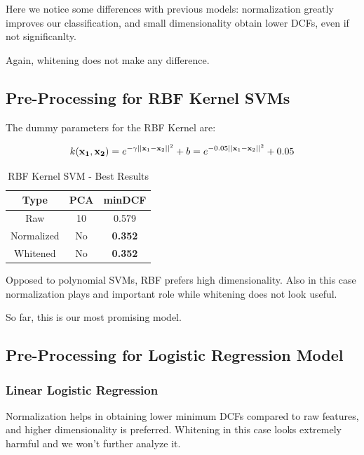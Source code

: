 \documentclass[hidelinks, 12pt, twocolumn]{article}
\begin{document}
Here we notice some differences with previous models:
normalization greatly improves our classification,
and small dimensionality obtain lower DCFs, 
even if not significanlty.

Again, whitening does not make any difference.

\subsection{Pre-Processing for RBF Kernel SVMs}

The dummy parameters for the RBF Kernel are:

$$\displaystyle k({\bf x_1}, {\bf x_2}) = e^{-\gamma||{\bf x}_1 - {\bf x}_2||^2} + b = e^{-0.05||{\bf x}_1 - {\bf x}_2||^2} + 0.05 $$

\begin{table}[H]
    \centering
        \begin{tabular}{||c|c|c||}
            \hline
            Type & PCA & minDCF \\
            \hline
            \hline
                Raw & 10 & 0.579 \\ 
                Normalized & No & {\bf 0.352} \\ 
                Whitened & No & {\bf 0.352} \\ 
            \hline
    \end{tabular}
    \caption{RBF Kernel SVM - Best Results}
\end{table}

Opposed to polynomial SVMs,
RBF prefers high dimensionality.
Also in this case normalization plays and important role while whitening does not look useful.

So far, this is our most promising model.

\subsection{Pre-Processing for Logistic Regression Model}

\subsubsection{Linear Logistic Regression}


Normalization helps in obtaining lower minimum DCFs compared to raw features,
and higher dimensionality is preferred.
Whitening in this case looks extremely harmful and we won't further analyze it.
\end{document}
